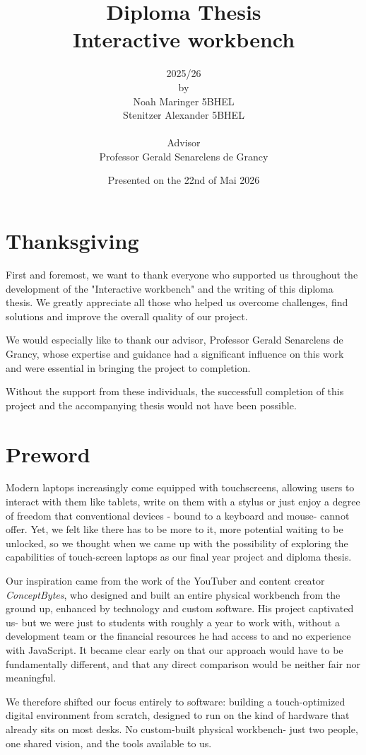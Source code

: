 \documentclass[a4paper,12pt]{article}
\title{Diploma Thesis \\ Interactive workbench}
\author{
  2025/26 \\
  by \\
  Noah Maringer 5BHEL \\
  Stenitzer Alexander 5BHEL \\
  \vspace{1cm} \\
  Advisor \\
  Professor Gerald Senarclens de Grancy
}
\date{Presented on the 22nd of Mai 2026}
\begin{document}
\maketitle
\thispagestyle{empty}
\newpage


\section{Thanksgiving}
First and foremost, we want to thank everyone who supported us throughout the development of the "Interactive workbench" and the writing of this diploma thesis. 
We greatly appreciate all those who helped us overcome challenges, find solutions and improve the overall quality of our project. 

We would especially like to thank our advisor, Professor Gerald Senarclens de Grancy, whose expertise and guidance had a significant influence on this work and were
essential in bringing the project to completion.

Without the support from these individuals, the successfull completion of this project and the accompanying thesis would not have been possible. 

\section{Preword}
Modern laptops increasingly come equipped with touchscreens, allowing users to interact with them like tablets, write on them with a stylus or just enjoy a degree of freedom that conventional devices - bound to a keyboard and mouse- cannot offer.
Yet, we felt like there has to be more to it, more potential waiting to be unlocked, so we thought when we came up with the possibility of exploring the capabilities of touch-screen laptops as our final year project and diploma thesis. 

Our inspiration came from the work of the YouTuber and content creator \textit{ConceptBytes}, who designed and built an entire physical workbench from the ground up, 
enhanced by technology and custom software.
His project captivated us- but we were just to students with roughly a year to work with, without a development team or the financial resources he had access to and no experience with JavaScript. 
It became clear early on that our approach would have to be fundamentally different, and that any direct comparison would be neither fair nor meaningful.

We therefore shifted our focus entirely to software: building a touch-optimized digital environment from scratch, designed to run on the kind of hardware
that already sits on most desks. No custom-built physical workbench- just two people, one shared vision, and the tools available to us. 
\end{document}
